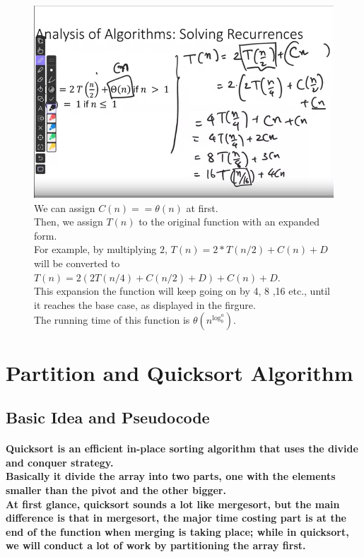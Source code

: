 \documentclass{article}
\begin{document}
\begin{figure}[H]
    \includegraphics[width=\textwidth]{expansionmethod.png}
    \caption{We can assign $C(n) == \theta(n)$ at first.\\
    Then, we assign $T(n)$ to the original function with an expanded form.\\
    For example, by multiplying $2$, $T(n) = 2*T(n/2) + C(n) + D$ will be converted to $T(n) = 2(2T(n/4) + C(n/2) + D) + C(n) +D$.\\
    This expansion the function will keep going on by 4, 8 ,16 etc., until it reaches the base case, as displayed in the firgure.\\
    The running time of this function is $\theta(n^{\log_b^a})$.\\}
\end{figure}

\section{Partition and Quicksort Algorithm}

\subsection{Basic Idea and Pseudocode}

\paragraph{Quicksort is an efficient in-place sorting algorithm that uses the divide and conquer strategy.\\
Basically it divide the array into two parts, one with the elements smaller than the pivot and the other bigger.\\
At first glance, quicksort sounds a lot like mergesort, but the main difference is that in mergesort, the major time costing part is
 at the end of the function when merging is taking place; while in quicksort, we will conduct a lot of work by partitioning the array first.\\}
\end{document}
